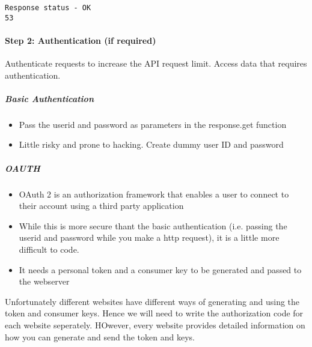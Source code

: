 \documentclass[11pt]{article}
\providecommand{\tightlist}{%
      \setlength{\itemsep}{0pt}\setlength{\parskip}{0pt}}
\begin{document}
    \begin{Verbatim}[commandchars=\\\{\}]
Response status - OK 
53

    \end{Verbatim}

    \paragraph{Step 2: Authentication (if
required)}\label{step-2-authentication-if-required}

Authenticate requests to increase the API request limit. Access data
that requires authentication.

\subparagraph{Basic Authentication}\label{basic-authentication}

\begin{itemize}
\tightlist
\item
  Pass the userid and password as parameters in the response.get
  function
\item
  Little risky and prone to hacking. Create dummy user ID and password
\end{itemize}

\subparagraph{OAUTH}\label{oauth}

\begin{itemize}
\tightlist
\item
  OAuth 2 is an authorization framework that enables a user to connect
  to their account using a third party application
\item
  While this is more secure thant the basic authentication (i.e. passing
  the userid and password while you make a http request), it is a little
  more difficult to code.
\item
  It needs a personal token and a consumer key to be generated and
  passed to the webserver
\end{itemize}

Unfortunately different websites have different ways of generating and
using the token and consumer keys. Hence we will need to write the
authorization code for each website seperately. HOwever, every website
provides detailed information on how you can generate and send the token
and keys.
\end{document}
